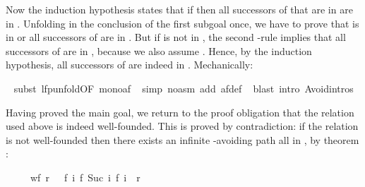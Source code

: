 \begin{isabellebody}
\begin{isamarkuptxt}
\begin{isabelle}
\end{isabelle}
Now the induction hypothesis states that if 
then all successors of  that are in  are in
. Unfolding  in the conclusion of the first
subgoal once, we have to prove that  is in  or all successors
of  are in .  But if  is not in ,
the second 
-rule implies that all successors of  are in
, because we also assume .
Hence, by the induction hypothesis, all successors of  are indeed in
. Mechanically:%
\end{isamarkuptxt}%
\isamarkuptrue%
\ \isamarkupfalse%
{}subst\ lfp{}unfold{}OF\ mono{}af{}{}\isanewline
\ \isamarkupfalse%
{}simp\ {}no{}asm{}\ add{}\ af{}def{}\isanewline
\ \isamarkupfalse%
{}blast\ intro{}\ Avoid{}intros{}%
\begin{isamarkuptxt}%
Having proved the main goal, we return to the proof obligation that the 
relation used above is indeed well-founded. This is proved by contradiction: if
the relation is not well-founded then there exists an infinite -avoiding path all in , by theorem
:
\begin{isabelle}%
\ \ \ \ \ wf\ r\ {}\ {}{}\ {}{}f{}\ {}i{}\ {}f\ {}Suc\ i{}{}\ f\ i{}\ {}\ r{}{}%

\end{isabelle}
\end{isamarkuptxt}
\end{isabellebody}
